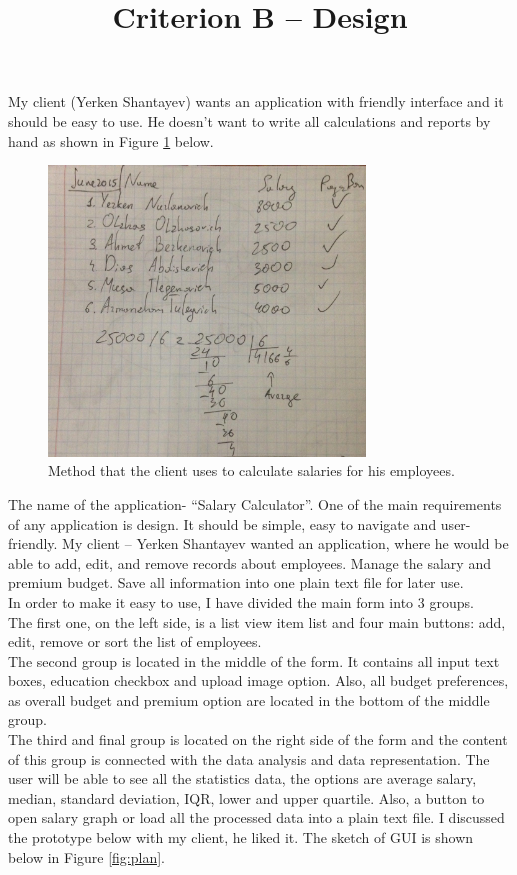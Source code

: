 \documentclass[a4]{article}
\title{Criterion B – Design}
\begin{document}
\doublespacing
My client (Yerken Shantayev) wants an application with friendly interface and it should be easy to use. He doesn’t want to write all calculations and reports by hand as shown in Figure \ref{fig:old} below.\\

\begin{figure}[h!]
\begin{center}
  \includegraphics[width=0.75\textwidth]{old.jpg}
  \caption{Method that the client uses to calculate salaries for his employees.}
  \label{fig:old}
\end{center}
\end{figure}

The name of the application- “Salary Calculator”. One of the main requirements of any application is design. It should be simple, easy to navigate and user-friendly. My client – Yerken Shantayev wanted an application, where he would be able to add, edit, and remove records about employees. Manage the salary and premium budget. Save all information into one plain text file for later use.\\
In order to make it easy to use, I have divided the main form into 3 groups. \\
The first one, on the left side, is a list view item list and four main buttons: add, edit, remove or sort the list of employees.\\
The second group is located in the middle of the form. It contains all input text boxes, education checkbox and upload image option. Also, all budget preferences, as overall budget and premium option are located in the bottom of the middle group.\\
The third and final group is located on the right side of the form and the content of this group is connected with the data analysis and data representation. The user will be able to see all the statistics data, the options are average salary, median, standard deviation, IQR, lower and upper quartile. Also, a button to open salary graph or load all the processed data into a plain text file. I discussed the prototype below with my client, he liked it. The sketch of GUI is shown below in Figure \ref{fig:plan}.\\
\end{document}

